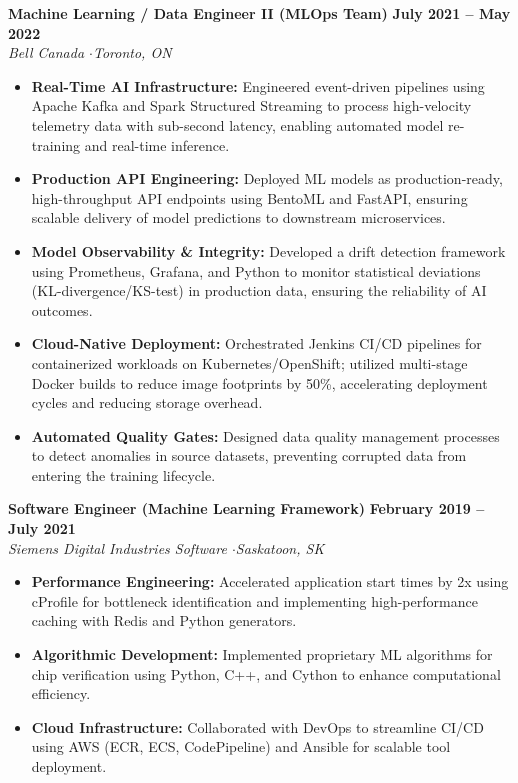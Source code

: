 \documentclass[10pt,letterpaper]{article}
\begin{document}
\noindent
\textbf{\large Machine Learning / Data Engineer II (MLOps Team)} \hfill \textbf{July 2021 -- May 2022} \\
\textit{\color{primary} Bell Canada \quad$\cdot$\quad Toronto, ON}
\begin{itemize}
    \item \textbf{Real-Time AI Infrastructure:} Engineered event-driven pipelines using Apache Kafka and Spark Structured Streaming to process high-velocity telemetry data with sub-second latency, enabling automated model re-training and real-time inference.
    \item \textbf{Production API Engineering:} Deployed ML models as production-ready, high-throughput API endpoints using BentoML and FastAPI, ensuring scalable delivery of model predictions to downstream microservices.
    \item \textbf{Model Observability \& Integrity:} Developed a drift detection framework using Prometheus, Grafana, and Python to monitor statistical deviations (KL-divergence/KS-test) in production data, ensuring the reliability of AI outcomes.
    \item \textbf{Cloud-Native Deployment:} Orchestrated Jenkins CI/CD pipelines for containerized workloads on Kubernetes/OpenShift; utilized multi-stage Docker builds to reduce image footprints by 50\%, accelerating deployment cycles and reducing storage overhead.
    \item \textbf{Automated Quality Gates:} Designed data quality management processes to detect anomalies in source datasets, preventing corrupted data from entering the training lifecycle.
\end{itemize}

\vspace{4pt}

\noindent
\textbf{\large Software Engineer (Machine Learning Framework)} \hfill \textbf{February 2019 -- July 2021} \\
\textit{\color{primary} Siemens Digital Industries Software \quad$\cdot$\quad Saskatoon, SK}
\begin{itemize}
    \item \textbf{Performance Engineering:} Accelerated application start times by 2x using cProfile for bottleneck identification and implementing high-performance caching with Redis and Python generators.
    \item \textbf{Algorithmic Development:} Implemented proprietary ML algorithms for chip verification using Python, C++, and Cython to enhance computational efficiency.
    \item \textbf{Cloud Infrastructure:} Collaborated with DevOps to streamline CI/CD using AWS (ECR, ECS, CodePipeline) and Ansible for scalable tool deployment.
\end{itemize}
\end{document}
